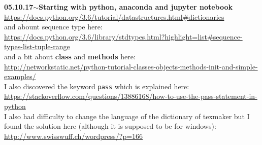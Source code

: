 \documentclass[11pt,a4paper]{article}
\newenvironment{loggentry}[2]%
{\noindent\textbf{#1}\hspace{1cm}$\mathbf{\sim}$\text{ }\textbf{#2}\\}{\vspace{0.5cm}}
\begin{document}
\begin{loggentry}{05.10.17}{Starting with python, anaconda and jupyter notebook}
\url{https://docs.python.org/3.6/tutorial/datastructures.html#dictionaries}\\
and abount sequence type here:\\
\url{https://docs.python.org/3.6/library/stdtypes.html?highlight=list#sequence-types-list-tuple-range}\\
and a bit about \textbf{class} and \textbf{methods} here:\\
\url{http://networkstatic.net/python-tutorial-classes-objects-methods-init-and-simple-examples/}\\
I also discovered the keyword \texttt{pass} which is explained here:\\
\url{https://stackoverflow.com/questions/13886168/how-to-use-the-pass-statement-in-python}\\
I also had difficulty to change the language of the dictionary of texmaker but I found the solution here (although it is supposed to be for windows):\\
\url{http://www.swisswuff.ch/wordpress/?p=166}\\
\end{loggentry}
\end{document}
